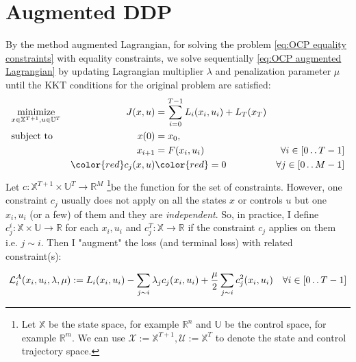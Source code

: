 \documentclass{report}
\newcommand{\twodots}{\mathinner {\ldotp \ldotp}}
\begin{document}
\section{Augmented DDP}
By the method augmented Lagrangian, for solving the problem \ref{eq:OCP equality constraints} with equality constraints, we solve sequentially \ref{eq:OCP augmented Lagrangian} by updating Lagrangian multiplier $\lambda$ and penalization parameter $\mu$ until the KKT conditions for the original problem are satisfied:
\begin{equation}
\label{eq:OCP equality constraints}
\begin{aligned}
&\underset{x \in \mathbb{X}^{T+1}, u \in \mathbb{U}^T}{\text{minimize}}          &J(x, u) &=\sum_{i = 0}^{T-1} L_i(x_i, u_i) + L_T(x_T) & \\
&\text{subject to}       &x(0)      &= x_0,  & \\ %
&				  &x_{i+1}  &= F(x_i, u_i)  &\forall i \in [0 \twodots T-1] \\
&	&\color{red} c_j(x, u) &\color{red} = 0 &\forall j \in [0 \twodots M-1]
\end{aligned}
\end{equation}
Let $c : \mathbb{X}^{T+1} \times \mathbb{U}^T \rightarrow \mathbb{R}^M$ \footnote{Let $\mathbb{X}$ be the state space, for example $\mathbb{R}^n$ and $\mathbb{U}$ be the control space, for example $\mathbb{R}^m$. We can use $\mathcal{X} := \mathbb{X}^{T+1}, \mathcal{U}:= \mathbb{X}^T$ to denote the state and control trajectory space.}be the function for the set of constraints. However, one constraint $c_j$ usually does not apply on all the states $x$ or controls $u$ but one $x_i, u_i$ (or a few) of them and they are \emph{independent}. So, in practice, I define $c_j^i : \mathbb{X} \times \mathbb{U} \rightarrow \mathbb{R}$ for each $x_i, u_i$ and $c_j^T : \mathbb{X} \rightarrow \mathbb{R}$ if the constraint $c_j$ applies on them i.e. $j \sim i$. Then I "augment" the loss (and terminal loss) with related constraint(s): 
\begin{tcolorbox}
\begin{equation}
\mathcal{L}^A_i(x_i, u_i, \lambda, \mu) := L_i(x_i, u_i) 
-\sum_{j \sim i}\lambda_j c_j(x_i, u_i) + \frac{\mu}{2} \sum_{j \sim i} c_j^2(x_i, u_i) \quad \forall i \in [0 \twodots T-1]
\end{equation}
\end{tcolorbox}
\end{document}
